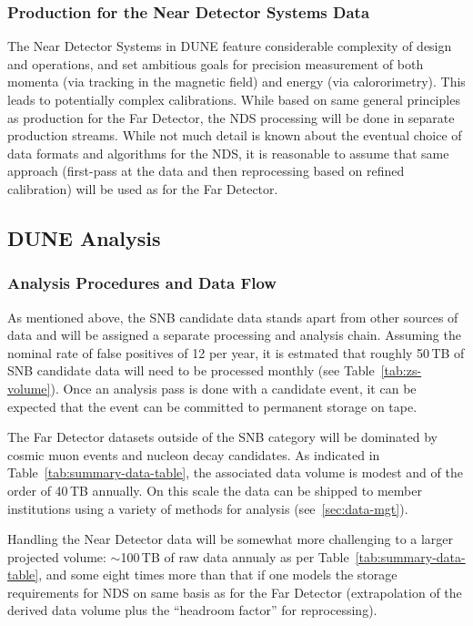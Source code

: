 \subsubsection{Production for the Near Detector Systems Data}
The Near Detector Systems in DUNE feature considerable complexity of design and operations, and set ambitious goals
for precision measurement of both momenta (via tracking in the magnetic field) and energy (via calororimetry). This leads to
potentially complex calibrations. While based on same general principles as production for the Far Detector, the NDS processing
will be done in separate production streams. While not much detail is known about the eventual choice of data formats and algorithms for
the NDS, it is reasonable to assume that same approach (first-pass at the data and then reprocessing based on refined calibration)
will be used as for the Far Detector.


\subsection{DUNE Analysis}
\subsubsection{Analysis Procedures and Data Flow}
As mentioned above, the SNB candidate data stands apart from other sources of data and will be assigned
a separate processing and analysis chain. Assuming the nominal rate
of false positives of 12 per year, it is estmated that roughly 50\,TB of SNB candidate data will need to be processed
monthly (see Table~\ref{tab:zs-volume}). Once an analysis pass is done with a candidate event, it can be expected
that the event can be committed to permanent storage on tape.

The Far Detector datasets outside of the SNB category will be dominated by cosmic muon events and nucleon decay candidates.
As indicated in Table~\ref{tab:summary-data-table}, the associated data volume is modest and of the order of 40\,TB annually.
On this scale the data can be shipped to member institutions using a variety of methods for analysis (see~\ref{sec:data-mgt}).

Handling the Near Detector data will be somewhat more challenging to a larger projected volume: $\sim$100\,TB of raw data annualy
as per Table~\ref{tab:summary-data-table}, and some eight times more than that if one models the storage requirements for NDS on
same basis as for the Far Detector (extrapolation of the derived data volume plus the ``headroom factor'' for reprocessing).


